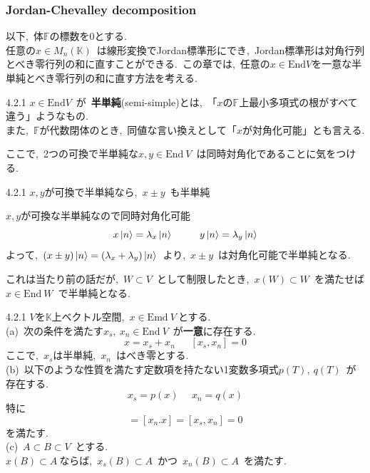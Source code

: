 \documentclass[uplatex,dvipdfmx]{jsarticle}
\begin{document}
\subsubsection{Jordan-Chevalley decomposition}
以下,~体$\mathbb{F}$の標数を0とする.\\
任意の$x\in M_n(\mathbb{K})$~は線形変換でJordan標準形にでき,~Jordan標準形は対角行列とべき零行列の和に直すことができる.~この章では,~任意の$x\in \text{End}V$を一意な半単純とべき零行列の和に直す方法を考える.
\begin{mydef}{4.2.1}
    $x\in \text{End}V$~が~\textbf{半単純}(semi-simple)とは,~「$x$の$\mathbb{F}$上最小多項式の根がすべて違う」ようなもの.\\
    また,~$\mathbb{F}$が代数閉体のとき,~同値な言い換えとして「$x$が対角化可能」とも言える.
\end{mydef}
ここで,~2つの可換で半単純な$x,y\in \text{End}~V$~は同時対角化であることに気をつける.
\begin{mylemma}{4.2.1}
    $x,y$が可換で半単純なら,~$x\pm y$~も半単純
\end{mylemma}
\begin{myproof}
    $x,y$が可換な半単純なので同時対角化可能
    \begin{equation*}
        x\ket{n}=\lambda_x\ket{n}~~~~~~~~y\ket{n}=\lambda_y\ket{n}
    \end{equation*}
    よって,~$(x\pm y) \ket{n}=(\lambda_x+\lambda_y )\ket{n}$~より,~$x\pm y$~は対角化可能で半単純となる.
\end{myproof}
これは当たり前の話だが,~$W\subset V$~として制限したとき,~$x(W)\subset W$~を満たせば$x\in \text{End}~W$~で半単純となる.
\begin{myprop}{4.2.1}
    $V$を$\mathbb{K}$上ベクトル空間,~$x\in \text{Emd}~V~$とする.\\
    (a)~次の条件を満たす$x_s,~x_n\in \text{End}~V$~が\textbf{一意}に存在する.
    \begin{equation*}
        x=x_s+x_n~~~~~~~[x_s,x_n]=0
    \end{equation*}
    ここで,~$x_s$は半単純,~$x_n$~はべき零とする.\\
    (b)~以下のような性質を満たす定数項を持たない1変数多項式$p(T),~q(T)$~が存在する.
    \begin{equation*}
        x_s = p(x)~~~~~~x_n=q(x)
    \end{equation*}
    特に
    \begin{equation*}
        [x_s,x]=[x_n.x]=[x_s,x_n]=0
    \end{equation*}
    を満たす.\\
    (c)~$A\subset B\subset V$~とする.\\
    $x(B)\subset A~$ならば,~$x_s(B)\subset A$~かつ~$x_n(B)\subset A$~を満たす.
\end{myprop}
\end{document}
